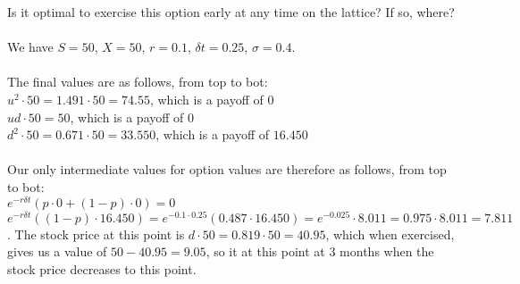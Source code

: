 \documentclass{article}
\begin{document}
{Is it optimal to exercise this option early at any time on the lattice? If so, where? \\ \\
We have $S = 50$, $X = 50$, $r = 0.1$, $\delta t = 0.25$, $\sigma = 0.4$. \\ \\
The final values are as follows, from top to bot: \\
$u^2 \cdot 50 = 1.491 \cdot 50 = 74.55$, which is a payoff of $0$ \\
$ud \cdot 50 = 50$, which is a payoff of $0$ \\
$d^2 \cdot 50 = 0.671 \cdot 50 = 33.550$, which is a payoff of $16.450$ \\ \\
Our only intermediate values for option values are therefore as follows, from top to bot: \\
$e^{-r \delta t} (p \cdot 0 + (1-p) \cdot 0) = 0$ \\
$e^{-r \delta t} ((1-p) \cdot 16.450) = e^{-0.1 \cdot 0.25} (0.487 \cdot 16.450) = e^{-0.025} \cdot 8.011 = 0.975 \cdot 8.011 = 7.811$. The stock price at this point is $d \cdot 50 = 0.819 \cdot 50 = 40.95$, which when exercised, gives us a value of $50 - 40.95 = 9.05$, so it  at this point at 3 months when the stock price decreases to this point.

}
\end{document}
